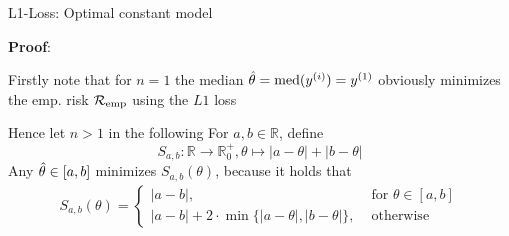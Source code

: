\documentclass[11pt,compress,t,notes=noshow, xcolor=table]{beamer}
\begin{document}
\begin{frame}{L1-Loss: Optimal constant model}


\textbf{Proof}: 

\begin{itemizeL}
\item Firstly note that for $n = 1$ the median $\hat{\theta} = \text{med}(y^{(i)}) = y^{(1)}$ obviously minimizes the emp. risk $\mathcal{R}_{\text{emp}}$ using the $L1$ loss 

\item Hence let $n > 1$ in the following For $a,b \in \mathbb{R}$, define 
$$S_{a,b}:\mathbb{R} \rightarrow \mathbb{R}^+_0, \theta \mapsto |a- \theta| + |b-\theta|$$
\vspace*{-0.3cm}
Any $\hat{\theta} \in [a,b]$ minimizes $S_{a,b}(\theta)$, because it holds that
\vspace*{-0.0cm}
\begin{align*}
S_{a,b}(\theta) = \begin{cases}|a-b| ,& \text{ for } \theta \in [a,b]\\ |a-b| + 2\cdot\min\{|a-\theta|,|b-\theta|\}
,& \text{ otherwise}\end{cases}
\end{align*}
\end{itemizeL}


\end{frame}
\end{document}
